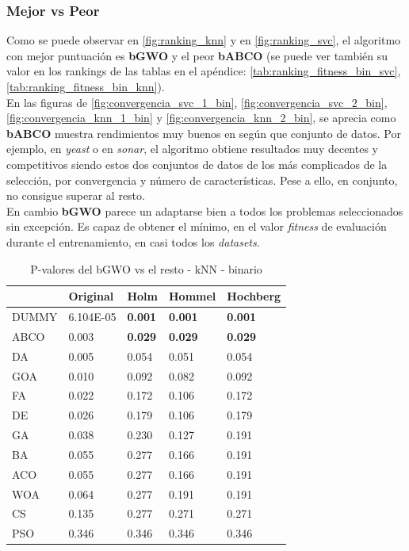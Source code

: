 \subsubsection{Mejor vs Peor}
Como se puede observar en \ref{fig:ranking_knn} y en \ref{fig:ranking_svc}, el algoritmo con mejor puntuación es \textbf{bGWO} y el peor \textbf{bABCO} (se puede ver también su valor en los rankings de las tablas en el apéndice: \ref{tab:ranking_fitness_bin_svc}, \ref{tab:ranking_fitness_bin_knn}). \\[6pt]
En las figuras de \ref{fig:convergencia_svc_1_bin}, \ref{fig:convergencia_svc_2_bin}, \ref{fig:convergencia_knn_1_bin} y \ref{fig:convergencia_knn_2_bin}, se aprecia como \textbf{bABCO} muestra rendimientos muy buenos en según que conjunto de datos. Por ejemplo, en \textit{yeast} o en \textit{sonar}, el algoritmo obtiene resultados muy decentes y competitivos siendo estos dos conjuntos de datos de los más complicados de la selección, por convergencia y número de características. Pese a ello, en conjunto, no consigue superar al resto.\\[6pt]
En cambio \textbf{bGWO} parece un adaptarse bien a todos los problemas seleccionados sin excepción. Es capaz de obtener el mínimo, en el valor \textit{fitness} de evaluación durante el entrenamiento, en casi todos los \textit{datasets}.
\begin{table}[htp]
    \centering
    \begin{tabular}{lllll}
        \toprule
        {}    & Original  & Holm           & Hommel         & Hochberg       \\
        \midrule
        DUMMY & 6.104E-05 & \textbf{0.001} & \textbf{0.001} & \textbf{0.001} \\
        ABCO  & 0.003     & \textbf{0.029} & \textbf{0.029} & \textbf{0.029} \\
        DA    & 0.005     & 0.054          & 0.051          & 0.054          \\
        GOA   & 0.010     & 0.092          & 0.082          & 0.092          \\
        FA    & 0.022     & 0.172          & 0.106          & 0.172          \\
        DE    & 0.026     & 0.179          & 0.106          & 0.179          \\
        GA    & 0.038     & 0.230          & 0.127          & 0.191          \\
        BA    & 0.055     & 0.277          & 0.166          & 0.191          \\
        ACO   & 0.055     & 0.277          & 0.166          & 0.191          \\
        WOA   & 0.064     & 0.277          & 0.191          & 0.191          \\
        CS    & 0.135     & 0.277          & 0.271          & 0.271          \\
        PSO   & 0.346     & 0.346          & 0.346          & 0.346          \\
        \bottomrule
    \end{tabular}
    \caption{P-valores del bGWO vs el resto - kNN - binario}
    \label{tab:p-values_gwo_vs_rest_knn}
\end{table}

